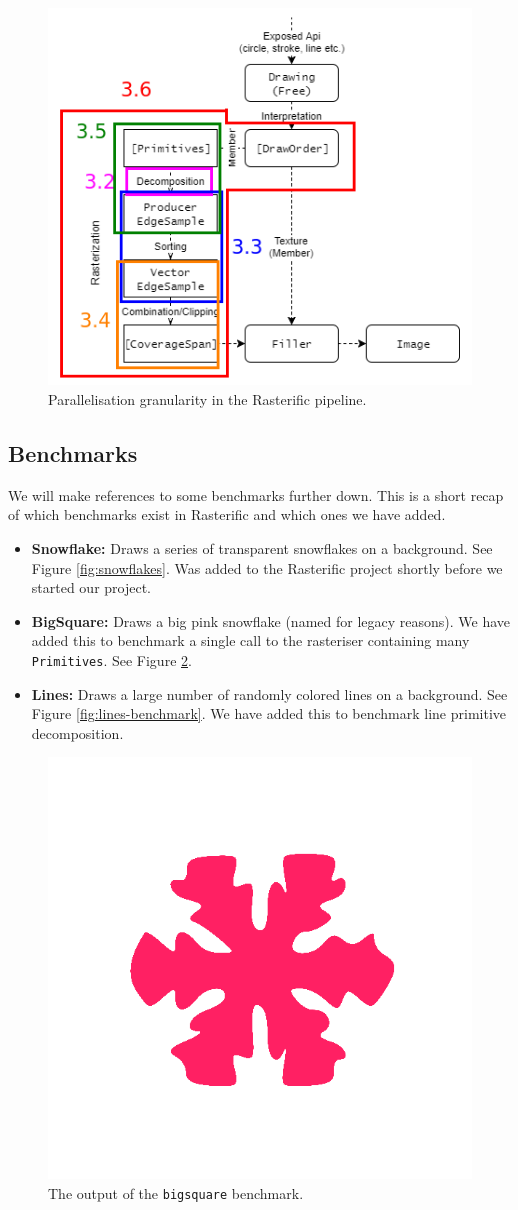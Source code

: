 \documentclass[12pt, a4paper]{article}
\begin{document}
\begin{figure}[H]
  \centering
  \includegraphics[width=.6\linewidth]{../rasterific-pipeline-flot}
  \caption{Parallelisation granularity in the Rasterific pipeline.}
  \label{fig:rasterific-pipeline-flot}
\end{figure}


\subsection{Benchmarks}\label{sec:benchmarks}
We will make references to some benchmarks further down. This is a short recap of which benchmarks exist in Rasterific and which ones we have added.
\begin{itemize}
\item \textbf{Snowflake:} Draws a series of transparent snowflakes on a background. See Figure \ref{fig:snowflakes}. Was added to the Rasterific project
   shortly before we started our project.
\item \textbf{BigSquare:} Draws a big pink snowflake (named for legacy reasons). We have added this to benchmark a single call to the rasteriser containing many \texttt{Primitives}. See Figure \ref{fig:bigsquare-benchmark}.
\item \textbf{Lines:} Draws a large number of randomly colored lines on a background. See Figure \ref{fig:lines-benchmark}.
  We have added this to benchmark line primitive decomposition.
\end{itemize}
\begin{figure}[h!]
  \centering
  \includegraphics[width=.2\linewidth]{../bigsquare}
  \caption{The output of the \texttt{bigsquare} benchmark.}
  \label{fig:bigsquare-benchmark}
\end{figure}
\end{document}
